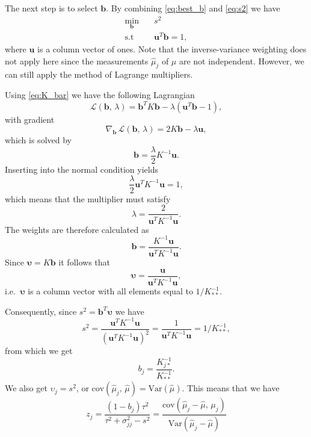 \documentclass[11pt]{article}
\theoremstyle{definition}
\begin{document}
The next step is to select $\bm b$. By combining \eqref{eq:best_b} and \eqref{eq:s2} we have
\begin{equation*}
    \begin{aligned}
        \underset{\bm b}{\min} &\quad s^2 \\
        \text{s.t} &\quad \bm u^T \bm b = 1,
    \end{aligned}
\end{equation*}
where $\bm u$ is a column vector of ones. Note that the inverse-variance weighting does not apply here since the measurements $\hat\mu_j$ of $\mu$ are not independent. However, we can still apply the method of Lagrange multipliers.

Using \eqref{eq:K_bar} we have the following Lagrangian
\begin{equation*}
    \mathcal{L}(\bm b,\, \lambda) = \bm b^T  K \bm b - \lambda (\bm u^T \bm b-1),
\end{equation*}
with gradient
\begin{equation*}
    \nabla_{\bm b}\, \mathcal{L}(\bm b,\, \lambda) = 2 K \bm b - \lambda \bm u,
\end{equation*}
which is solved by
\begin{equation*}
    \bm b = \frac{\lambda}{2} K ^{-1}\bm u.
\end{equation*}
Inserting into the normal condition yields
\begin{equation*}
    \frac{\lambda}{2}\bm u ^T K ^{-1}\bm u = 1,
\end{equation*}
which means that the multiplier must satisfy
\begin{equation*}
    \lambda = \frac{2}{\bm u ^T K ^{-1}\bm u}.
\end{equation*}
The weights are therefore calculated as
\begin{equation*}
    \bm b = \frac{ K ^{-1}\bm u}{\bm u ^T K ^{-1}\bm u}.
\end{equation*}
Since $\bm \upsilon =  K \bm b$ it follows that
\begin{equation*}
    \bm \upsilon = \frac{\bm u}{\bm u ^T K ^{-1}\bm u},
\end{equation*}
i.e.\ $\bm \upsilon$ is a column vector with all elements equal to $1/ K ^{-1}_{\ast\ast}$.

Consequently, since $s^2=\bm b^{T}\bm\upsilon$ we have
\begin{equation}\label{eq:s2_best}
    s^2 = \frac{\bm u^T  K ^{-1}\bm u}{(\bm u ^T K ^{-1}\bm u)^2} = \frac{1}{\bm u ^T K ^{-1}\bm u} = 1/ K ^{-1}_{\ast\ast},
\end{equation}
from which we get
\begin{equation}\label{eq:b_best}
    b_j = \frac{ K_{j\ast}^{-1}}{ K_{\ast\ast}^{-1}}.
\end{equation}
We also get $\upsilon_j=s^2$, or $\text{cov}(\hat\mu_j,\, \hat\mu)=\text{Var}(\hat\mu)$. This means that we have
\begin{equation}\label{eq:s2_cov_var}
    z_j = \frac{(1-b_j)\tau^2}{\tau^2 + \sigma_{jj}^2 - s^2} = \frac{\text{cov}(\hat\mu_j - \hat\mu,\, \mu_j)}{\text{Var}(\hat\mu_j - \hat\mu)}
\end{equation}
\end{document}
